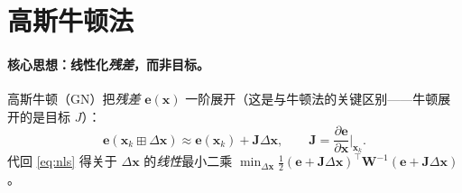 \section{高斯牛顿法}
\label{sec:nlopt-gn}

\paragraph{核心思想：线性化\emph{残差}，而非目标。}
高斯牛顿（GN）把\emph{残差} $\mathbf{e}(\mathbf{x})$ 一阶展开（这是与牛顿法的关键区别——牛顿展开的是目标 $J$）\cite{gaoxiang2019slam14,barfoot2024state}：
\begin{equation}
  \mathbf{e}(\mathbf{x}_k\boxplus\Delta\mathbf{x})\approx\mathbf{e}(\mathbf{x}_k)+\mathbf{J}\Delta\mathbf{x},\qquad \mathbf{J}=\frac{\partial\mathbf{e}}{\partial\mathbf{x}}\bigg|_{\mathbf{x}_k}.
  \label{eq:gn-linearize}
\end{equation}
代回 \cref{eq:nls} 得关于 $\Delta\mathbf{x}$ 的\emph{线性}最小二乘 $\min_{\Delta\mathbf{x}}\tfrac12(\mathbf{e}+\mathbf{J}\Delta\mathbf{x})^\top\mathbf{W}^{-1}(\mathbf{e}+\mathbf{J}\Delta\mathbf{x})$。

